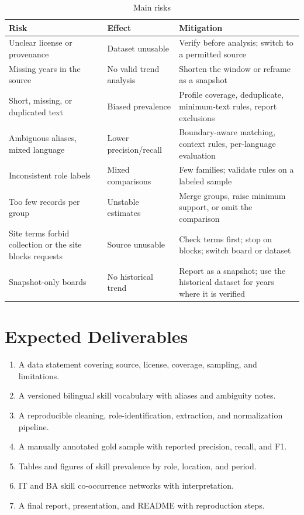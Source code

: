 \documentclass[12pt,a4paper]{article}
\begin{document}
\begin{table}[H]
\centering\small
\caption{Main risks}
\label{tab:risks}
\begin{tabularx}{\textwidth}{@{}P{4.0cm} P{3.4cm} L@{}}
\toprule
\textbf{Risk} & \textbf{Effect} & \textbf{Mitigation} \\
\midrule
Unclear license or provenance & Dataset unusable & Verify before analysis;
  switch to a permitted source \\
Missing years in the source & No valid trend analysis & Shorten the window
  or reframe as a snapshot \\
Short, missing, or duplicated text & Biased prevalence & Profile coverage,
  deduplicate, minimum-text rules, report exclusions \\
Ambiguous aliases, mixed language & Lower precision/recall & Boundary-aware
  matching, context rules, per-language evaluation \\
Inconsistent role labels & Mixed comparisons & Few families; validate rules
  on a labeled sample \\
Too few records per group & Unstable estimates & Merge groups, raise
  minimum support, or omit the comparison \\
Site terms forbid collection or the site blocks requests & Source unusable
  & Check terms first; stop on blocks; switch board or dataset \\
Snapshot-only boards & No historical trend & Report as a snapshot; use the
  historical dataset for years where it is verified \\
\bottomrule
\end{tabularx}
\end{table}

\section{Expected Deliverables}
\begin{enumerate}
  \item A data statement covering source, license, coverage, sampling, and
        limitations.
  \item A versioned bilingual skill vocabulary with aliases and ambiguity
        notes.
  \item A reproducible cleaning, role-identification, extraction, and
        normalization pipeline.
  \item A manually annotated gold sample with reported precision, recall,
        and F1.
  \item Tables and figures of skill prevalence by role, location, and period.
  \item IT and BA skill co-occurrence networks with interpretation.
  \item A final report, presentation, and README with reproduction steps.
\end{enumerate}
\end{document}
